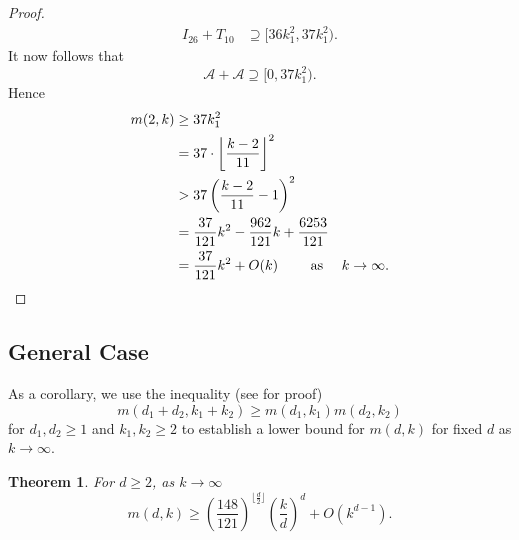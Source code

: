 \documentclass[11pt]{article}
\newtheorem{theorem}{Theorem}[section]
\theoremstyle{definition}
\begin{document}
\begin{proof}
\begin{align*}
I_{26} + T_{10}  &\supseteq [36k_1^2, 37k_1^2).
\end{align*}
It now follows that 
\[
\mathcal{A} + \mathcal{A} \supseteq [0, 37k_1^2).
\]
Hence
\begin{align*}
m(2,k) &\geq 37k_1^2\\
&= 37 \cdot \left \lfloor \frac{k - 2}{11}\right \rfloor^2\\
&> 37 \left(\frac{k - 2}{11} -1\right) ^2\\
&= \frac{37}{121}k^2-\frac{962}{121}k+\frac{6253}{121}\\
&= \frac{37}{121}k^2 + O(k)\qquad \text{ as }\quad k \to \infty. \qedhere
\end{align*}
\end{proof}




\subsection{General Case}
As a corollary, we use the inequality (see \cite{Hsu-Jia:CombinatorialNetworks} for proof)
\[
m(d_1+d_2,k_1+k_2) \geq m(d_1,k_1)m(d_2,k_2) 
\]
for $d_1, d_2 \geq 1$ and $k_1, k_2 \geq 2$ to establish a lower bound for $m(d,k)$ for fixed $d$ as $k \to \infty$.
\begin{theorem}
For $d \geq 2$, as $k \to \infty$ 
\[
m(d,k) \geq \left(\frac{148}{121}\right)^{\lfloor \frac{d}{2}\rfloor}\left(\frac{k}{d}\right)^d + O(k^{d-1}).
\]
\end{theorem}
\end{document}

